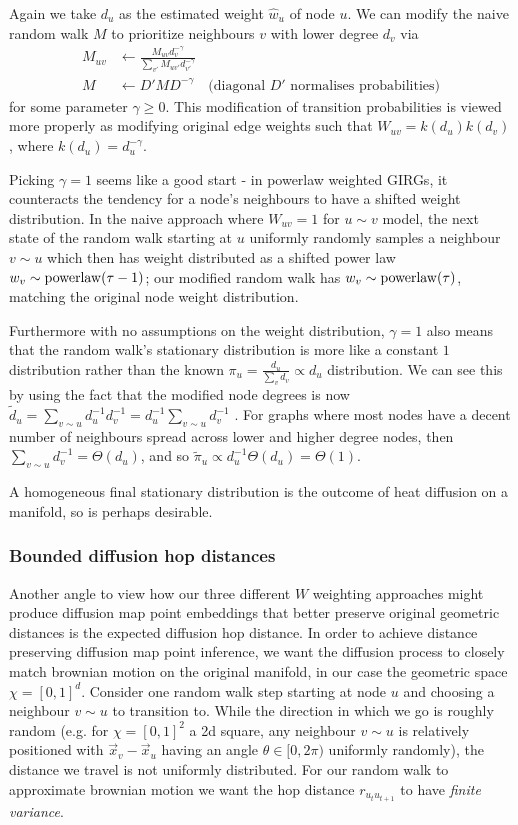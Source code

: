Again we take $d_u$ as the estimated weight $\hat{w}_u$ of node $u$. 
We can modify the naive random walk $M$ to prioritize neighbours $v$ with lower degree $d_v$ via
\begin{align*}
  M_{uv} &\gets \frac{M_{uv} {d_v^{-\gamma}}}{\sum_{v'} M_{uv'} {d_{v'}^{-\gamma}}}
  \\
  M &\gets D' M D^{-\gamma} \quad \text{(diagonal $D'$ normalises probabilities)}
\end{align*}
for some parameter $\gamma \geq 0$. This modification of transition probabilities is viewed more properly as modifying original edge weights such that $W_{uv} = k(d_u) k(d_v)$, where $k(d_u) = d_u^{-\gamma}$.


Picking $\gamma=1$ seems like a good start - in powerlaw weighted GIRGs, it counteracts the tendency for a node's neighbours to have a shifted weight distribution. In the naive approach where $W_{uv} = 1$ for $u \sim v$  model, the next state of the random walk starting at $u$ uniformly randomly samples a neighbour $v \sim u$ which then has weight distributed as a shifted power law $w_v \sim \operatorname{powerlaw}(\tau - 1)$; our modified random walk has $w_v \sim \operatorname{powerlaw}(\tau)$, matching the original node weight distribution. 

Furthermore with no assumptions on the weight distribution, $\gamma=1$ also means that the random walk's stationary distribution is more like a constant $1$ distribution rather than the known $\pi_u = \frac{d_u}{\sum_v d_v} \propto d_u$ distribution.
We can see this by using the fact that the modified node degrees is now $\tilde{d}_u = \sum_{v \sim u} d_u^{-1} d_v^{-1} = d_u^{-1} \sum_{v \sim u} d_v^{-1}$
.
For graphs where most nodes have a decent number of neighbours spread across lower and higher degree nodes, then $\sum_{v \sim u} d_v^{-1} = \Theta(d_u)$, and so $\tilde{\pi}_u \propto d_u^{-1} \Theta(d_u) = \Theta(1)$.

A homogeneous final stationary distribution is the outcome of heat diffusion on a manifold, so is perhaps desirable.


\subsubsection{Bounded diffusion hop distances}
Another angle to view how our three different $W$ weighting approaches might produce diffusion map point embeddings that better preserve original geometric distances is the expected diffusion hop distance. In order to achieve distance preserving diffusion map point inference, we want the diffusion process to closely match brownian motion on the original manifold, in our case the geometric space $\chi = [0,1]^d$. Consider one random walk step starting at node $u$ and choosing a neighbour $v \sim u$ to transition to. While the direction in which we go is roughly random (e.g. for $\chi=[0,1]^2$ a 2d square, any neighbour $v \sim u$ is relatively positioned with $\vec{x}_v - \vec{x}_u$ having an angle $\theta \in [0, 2\pi)$ uniformly randomly), the distance we travel is not uniformly distributed. For our random walk to approximate brownian motion we want the hop distance $r_{u_t u_{t+1}}$ to have \textit{finite variance}. 


